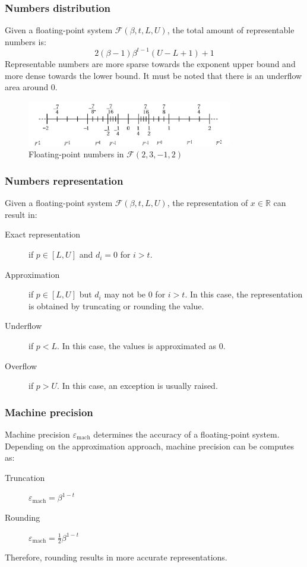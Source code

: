 \subsubsection{Numbers distribution}
Given a floating-point system $\mathcal{F}(\beta, t, L, U)$, the total amount of representable numbers is:
\begin{equation*}
    2(\beta-1) \beta^{t-1} (U-L+1)+1
\end{equation*}
%
Representable numbers are more sparse towards the exponent upper bound and more dense towards the lower bound.
It must be noted that there is an underflow area around 0.
\begin{figure}[h]
    \centering
    \includegraphics[width=0.8\textwidth]{img/floatingpoint_range.png}
    \caption{Floating-point numbers in $\mathcal{F}(2, 3, -1, 2)$}
\end{figure}


\subsubsection{Numbers representation}
Given a floating-point system $\mathcal{F}(\beta, t, L, U)$, the representation of $x \in \mathbb{R}$ can result in:
\begin{description}
    \item[Exact representation] 
        if $p \in [L, U]$ and $d_i=0$ for $i>t$.

    \item[Approximation] 
        if $p \in [L, U]$ but $d_i$ may not be 0 for $i>t$. 
        In this case, the representation is obtained by truncating or rounding the value.

    \item[Underflow] 
        if $p < L$. In this case, the values is approximated as 0.

    \item[Overflow] 
        if $p > U$. In this case, an exception is usually raised.
\end{description}


\subsubsection{Machine precision}
Machine precision $\varepsilon_{\text{mach}}$ determines the accuracy of a floating-point system. 
Depending on the approximation approach, machine precision can be computes as:
\begin{description}
    \item[Truncation] $\varepsilon_{\text{mach}} = \beta^{1-t}$
    \item[Rounding] $\varepsilon_{\text{mach}} = \frac{1}{2}\beta^{1-t}$
\end{description}
Therefore, rounding results in more accurate representations.

